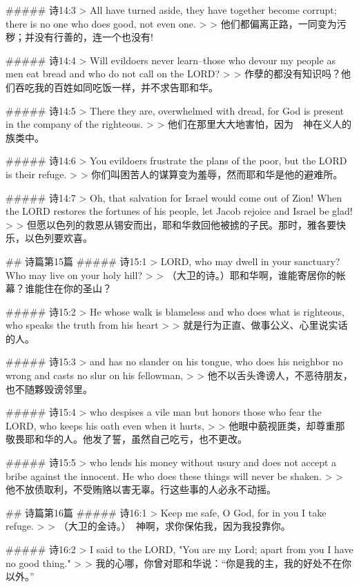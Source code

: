 ##### 诗14:3
> All have turned aside, they have together become corrupt; there is no one who does good, not even one.
>
> 他们都偏离正路，一同变为污秽；并没有行善的，连一个也没有!


##### 诗14:4
> Will evildoers never learn--those who devour my people as men eat bread and who do not call on the LORD?
>
> 作孽的都没有知识吗？他们吞吃我的百姓如同吃饭一样，并不求告耶和华。


##### 诗14:5
> There they are, overwhelmed with dread, for God is present in the company of the righteous.
>
> 他们在那里大大地害怕，因为　神在义人的族类中。


##### 诗14:6
> You evildoers frustrate the plans of the poor, but the LORD is their refuge.
>
> 你们叫困苦人的谋算变为羞辱，然而耶和华是他的避难所。


##### 诗14:7
> Oh, that salvation for Israel would come out of Zion! When the LORD restores the fortunes of his people, let Jacob rejoice and Israel be glad!
>
> 但愿以色列的救恩从锡安而出，耶和华救回他被掳的子民。那时，雅各要快乐，以色列要欢喜。


## 诗篇第15篇
##### 诗15:1
> LORD, who may dwell in your sanctuary? Who may live on your holy hill?
>
> （大卫的诗。）耶和华啊，谁能寄居你的帐幕？谁能住在你的圣山？


##### 诗15:2
> He whose walk is blameless and who does what is righteous, who speaks the truth from his heart
>
> 就是行为正直、做事公义、心里说实话的人。


##### 诗15:3
> and has no slander on his tongue, who does his neighbor no wrong and casts no slur on his fellowman,
>
> 他不以舌头谗谤人，不恶待朋友，也不随夥毁谤邻里。


##### 诗15:4
> who despises a vile man but honors those who fear the LORD, who keeps his oath even when it hurts,
>
> 他眼中藐视匪类，却尊重那敬畏耶和华的人。他发了誓，虽然自己吃亏，也不更改。


##### 诗15:5
> who lends his money without usury and does not accept a bribe against the innocent. He who does these things will never be shaken.
>
> 他不放债取利，不受贿赂以害无辜。行这些事的人必永不动摇。


## 诗篇第16篇
##### 诗16:1
> Keep me safe, O God, for in you I take refuge.
>
> （大卫的金诗。）　神啊，求你保佑我，因为我投靠你。


##### 诗16:2
> I said to the LORD, "You are my Lord; apart from you I have no good thing."
>
> 我的心哪，你曾对耶和华说：“你是我的主，我的好处不在你以外。”


